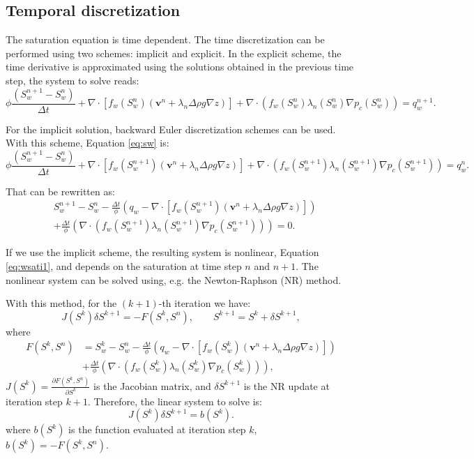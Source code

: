 \documentclass{article}
\begin{document}
\subsection*{Temporal discretization}
\hspace{0.5cm}The saturation equation is time dependent. The time discretization can be performed using two schemes: implicit and explicit. In the explicit scheme, the time derivative is approximated using the solutions obtained in the previous time step, the system to solve reads:
\begin{equation}\label{eq:wsate}
 \phi\frac{( {S}_{w}^{n+1}-{S}_{w}^n)}{\Delta t}+\nabla \cdot [f_w({S}_{w}^n)( \mathbf{v}^n+\lambda_n\Delta  \rho g\nabla z)]+\nabla \cdot(f_w({S}_{w}^n)\lambda_n({S}_{w}^n)\nabla p_c({S}_{w}^n))= q_w^{n+1}.
\end{equation}\par
For the implicit solution, backward Euler discretization schemes can be used. With this scheme, Equation \eqref{eq:sw} is:
\begin{equation}\label{eq:wsati}
 \phi\frac{( {S}_{w}^{n+1}-{S}_{w}^n)}{\Delta t}+\nabla \cdot [f_w({S}_{w}^{n+1})( \mathbf{v}^n+\lambda_n\Delta  \rho g\nabla z)]+\nabla \cdot(f_w({S}_{w}^{n+1})\lambda_n({S}_{w}^{n+1})\nabla p_c({S}_{w}^{n+1}))= q_w^n.
\end{equation}\par
That can be rewritten as:
\begin{align}\label{eq:wsati1}
 &{S}_{w}^{n+1}-{S}_{w}^n-\frac{\Delta t}{\phi}\left(q_w-\nabla \cdot [f_w({S}_{w}^{n+1})( \mathbf{v}^n+\lambda_n\Delta  \rho g\nabla z)]\right)\nonumber \\ 
 &+\frac{\Delta t}{\phi}\left(\nabla\cdot(f_w({S}_{w}^{n+1})\lambda_n({S}_{w}^{n+1})\nabla p_c({S}_{w}^{n+1}))\right)=0.
\end{align}\par
 If we use the implicit scheme, the resulting system is nonlinear, Equation \eqref{eq:wsati1}, and depends on the saturation at time step $n$ and $n+1$. The nonlinear system can be solved using, e.g. the Newton-Raphson (NR) method. \par 
 With this method, for the $(k+1)$-th iteration we have:
$${J}({S}^k)\delta{S}^{k+1}=-{F}({S}^k,{S}^n),
\qquad {S}^{k+1}={S}^k+\delta {S}^{k+1},$$
where
\begin{align}\label{eq:wsati2}
 {F}({S}^k,{S}^n)&={S}_{w}^{k}-{S}_{w}^n-\frac{\Delta t}{\phi}\left(q_w-\nabla \cdot [f_w({S}_{w}^{k})( \mathbf{v}^n+\lambda_n\Delta  \rho g\nabla z)]\right)\nonumber \\ 
 &+\frac{\Delta t}{\phi}\left(\nabla\cdot(f_w({S}_{w}^{k})\lambda_n({S}_{w}^{k})\nabla p_c({S}_{w}^{k}))\right),
\end{align}
${J}({S}^k)=\frac{\partial {F}({S}^k,{S}^n)}{\partial {S}^k}$ is the 
Jacobian matrix, and $\delta {S}^{k+1}$ is the NR update at iteration step $k+1$. Therefore, the linear system to solve is:\\
\begin{equation}\label{eq:lsS}
{J}({S}^k)\delta {S}^{k+1}={b}({S}^k).
\end{equation}
where ${b}({S}^k)$ is the function evaluated at iteration step $k$, ${b}({S}^k)=-{F}({S}^k,{S}^n)$.
\end{document}
